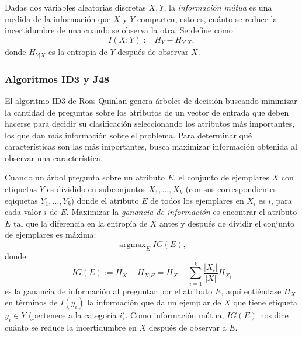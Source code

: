 \documentclass[spanish,11pt,letterpaper]{article}
\begin{document}
Dadas dos variables aleatorias discretas $X,Y$, la \textit{información mútua} es
una medida de la información que $X$ y $Y$ comparten, esto es, cuánto se reduce
la incertidumbre de una cuando se observa la otra. Se define como
\[I(X;Y) := H_Y-H_{Y|X},\]
donde $H_{Y|X}$ es la entropía de $Y$ después de observar $X$.

\subsubsection{Algoritmos ID3 y J48}

El algoritmo ID3 de Ross Quinlan genera árboles de decisión buscando minimizar la
cantidad de preguntas sobre los atributos de un vector de entrada que deben hacerse
para decidir su clasificación seleccionando los atributos más importantes,
los que dan más información sobre el problema. Para determinar qué características son
las más importantes, busca maximizar información obtenida al observar una
característica.

Cuando un árbol pregunta sobre un atributo $E$, el conjunto de ejemplares $X$ con
etiquetas $Y$ es dividido en subconjuntos $X_1,\ldots,X_k$ (con sus correspondientes
eqiquetas $Y_1,\ldots,Y_k$) donde el atributo $E$ de todos los ejemplares en $X_i$
es $i$, para cada valor $i$ de $E$. Maximizar la
\textit{ganancia de información} es encontrar el atributo $E$ tal que la diferencia
en la entropía de $X$ antes y después de dividir el conjunto de ejemplares es
máxima:
\[\operatorname{arg max}_E IG(E),\]
donde
\[IG(E) := H_X - H_{X|E} = H_X - \sum_{i=1}^k \frac{|X_i|}{|X|}H_{X_i}\]
es la ganancia de información al preguntar por el atributo $E$, aquí entiéndase
$H_X$ en términos de $I(y_i)$ la información que da un ejemplar de $X$ que tiene
etiqueta $y_i \in Y$ (pertenece a la categoría $i$). Como
información mútua, $IG(E)$ nos dice cuánto se reduce la incertidumbre en $X$ después
de observar a $E$.
\end{document}
